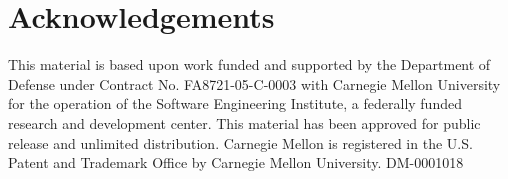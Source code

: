 \documentclass{sig-alternate-ipsn13}
\begin{document}
\section{Acknowledgements}
\label{sec:acknowledgements}

This material is based upon work funded and supported by the Department of
Defense under Contract No. FA8721-05-C-0003 with Carnegie Mellon University
for the operation of the Software Engineering Institute, a federally funded research
and development center. This material has been approved for public release and
unlimited distribution. Carnegie Mellon is registered in the U.S. Patent and
Trademark Office by Carnegie Mellon University. DM-0001018

 

\end{document}
